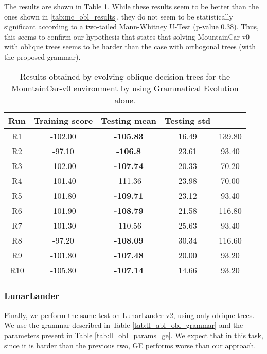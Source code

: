\documentclass[review,english]{elsarticle}
\begin{document}
The results are shown in Table \ref{tab:mc_abl_obl_results}.
While these results seem to be better than the ones shown in \ref{tab:mc_obl_results}, they do not seem to be statistically significant according to a two-tailed Mann-Whitney U-Test (p-value 0.38).
Thus, this seems to confirm our hypothesis that states that solving MountainCar-v0 with oblique trees seems to be harder than the case with orthogonal trees (with the proposed grammar).

\begin{table}[ht]
    \centering
    \begin{tabular}{|c|c|c|c|c|} \hline
        \textbf{Run} & \textbf{Training score} & \textbf{Testing mean} & \textbf{Testing std} & \textbf{} \\ \hline
        R1 & -102.00 & \textbf{-105.83} & 16.49 & 139.80 \\ R2 & -97.10 & \textbf{-106.8} & 23.61 & 93.40 \\ R3 & -102.00 & \textbf{-107.74} & 20.33 & 70.20 \\ R4 & -101.40 & -111.36 & 23.98 & 70.00 \\ R5 & -101.80 & \textbf{-109.71} & 23.12 & 93.40 \\ R6 & -101.90 & \textbf{-108.79} & 21.58 & 116.80 \\ R7 & -101.30 & -110.56 & 25.63 & 93.40 \\ R8 & -97.20 & \textbf{-108.09} & 30.34 & 116.60 \\ R9 & -101.80 & \textbf{-107.48} & 20.00 & 93.20 \\ R10 & -105.80 & \textbf{-107.14} & 14.66 & 93.20 \\ \hline
    \end{tabular}
    \caption{Results obtained by evolving oblique decision trees for the MountainCar-v0 environment by using Grammatical Evolution alone.}
    \label{tab:mc_abl_obl_results}
\end{table}

\subsubsection{LunarLander}
Finally, we perform the same test on LunarLander-v2, using only oblique trees.
We use the grammar described in Table \ref{tab:ll_abl_obl_grammar} and the parameters present in Table \ref{tab:ll_obl_params_ge}.
We expect that in this task, since it is harder than the previous two, GE performs worse than our approach.
\end{document}
